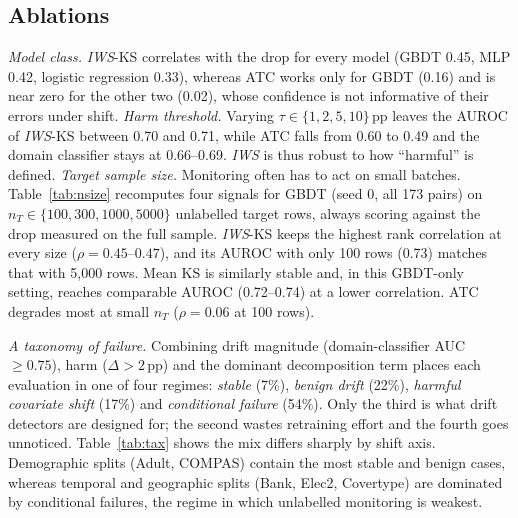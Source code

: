 \documentclass[conference]{IEEEtran}
\makeatletter
\def\section{\@startsection{section}{1}{\z@}{1.5ex plus 1.5ex minus 0.5ex}{0.7ex plus 1ex minus 0ex}{\normalfont\normalsize\centering\itshape}}
\theoremstyle{plainhead}
\newcommand{\iws}{\textit{IWS}}
\newcommand{\pp}{\,pp\xspace}
\makeatother
\begin{document}
\subsection{Ablations}
\label{sec:ablation}
\textit{Model class.} \iws{}-KS correlates with the drop for every model (GBDT 0.45, MLP 0.42, logistic regression 0.33), whereas ATC works only for GBDT (0.16) and is near zero for the other two (0.02), whose confidence is not informative of their errors under shift.
\textit{Harm threshold.} Varying $\tau\in\{1,2,5,10\}$\pp leaves the AUROC of \iws{}-KS between 0.70 and 0.71, while ATC falls from 0.60 to 0.49 and the domain classifier stays at 0.66--0.69. \iws{} is thus robust to how ``harmful'' is defined.
\textit{Target sample size.} Monitoring often has to act on small batches. Table~\ref{tab:nsize} recomputes four signals for GBDT (seed 0, all 173 pairs) on $n_T\in\{100,300,1000,5000\}$ unlabelled target rows, always scoring against the drop measured on the full sample. \iws{}-KS keeps the highest rank correlation at every size ($\rho=0.45$--$0.47$), and its AUROC with only 100 rows (0.73) matches that with 5{,}000 rows. Mean KS is similarly stable and, in this GBDT-only setting, reaches comparable AUROC (0.72--0.74) at a lower correlation. ATC degrades most at small $n_T$ ($\rho=0.06$ at 100 rows).

\begin{table}[t]
\centering
\caption{Effect of the number of unlabelled target rows $n_T$ (GBDT, seed 0, 173 pairs). Cells: Spearman $\rho$ / AUROC for harm ($\Delta>2$\pp).}
\label{tab:nsize}
\footnotesize
\setlength{\tabcolsep}{3.5pt}

\end{table}

\section{Discussion}
\textit{A taxonomy of failure.} Combining drift magnitude (domain-classifier AUC $\ge0.75$), harm ($\Delta>2$\pp) and the dominant decomposition term places each evaluation in one of four regimes: \emph{stable} (7\%), \emph{benign drift} (22\%), \emph{harmful covariate shift} (17\%) and \emph{conditional failure} (54\%). Only the third is what drift detectors are designed for; the second wastes retraining effort and the fourth goes unnoticed. Table~\ref{tab:tax} shows the mix differs sharply by shift axis. Demographic splits (Adult, COMPAS) contain the most stable and benign cases, whereas temporal and geographic splits (Bank, Elec2, Covertype) are dominated by conditional failures, the regime in which unlabelled monitoring is weakest.
\end{document}
